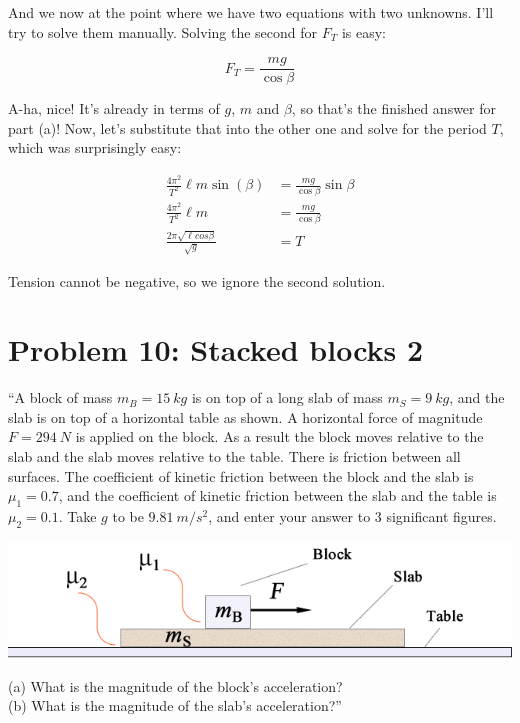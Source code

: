 \documentclass[12pt,a4paper]{report}
\begin{document}
And we now at the point where we have two equations with two unknowns. I'll try to solve them manually. Solving the second for $F_T$ is easy:

\begin{equation}
F_T = \frac{m g}{\cos \beta}
\end{equation}

A-ha, nice! It's already in terms of $g$, $m$ and $\beta$, so that's the finished answer for part (a)! Now, let's substitute that into the other one and solve for the period $T$, which was surprisingly easy:

\begin{align}
\frac{4\pi^2}{T^2} \ell m \sin (\beta) &= \frac{m g}{\cos \beta} \sin \beta\\
\frac{4\pi^2}{T^2} \ell m &= \frac{m g}{\cos \beta}\\
\frac{2 \pi \sqrt{\ell cos \beta}}{\sqrt{g}} &= T
\end{align}

Tension cannot be negative, so we ignore the second solution.

\section{Problem 10: Stacked blocks 2}

``A block of mass $m_B = \SI{15}{kg}$ is on top of a long slab of mass $m_S = \SI{9}{kg}$, and the slab is on top of a horizontal table as shown. A horizontal force of magnitude $F = \SI{294}{N}$ is applied on the block. As a result the block moves relative to the slab and the slab moves relative to the table. There is friction between all surfaces. The coefficient of kinetic friction between the block and the slab is $\mu_1 = 0.7$, and the coefficient of kinetic friction between the slab and the table is $\mu_2 = 0.1$. Take $g$ to be $\SI{9.81}{m/s^2}$, and enter your answer to 3 significant figures.

\begin{center}
\includegraphics[scale=1.0]{Graphics/h3p10}
\end{center}

(a) What is the magnitude of the block's acceleration?\\
(b) What is the magnitude of the slab's acceleration?''
\end{document}

